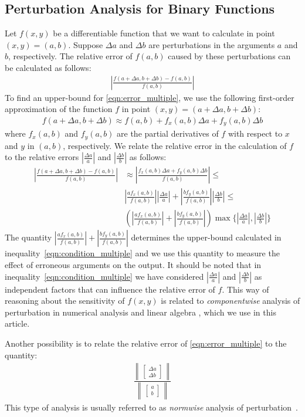 \documentclass{article}
\newcommand{\dx}{\Delta a}
\newcommand{\dy}{\Delta b}
\numberwithin{mytheorem}{section}
\begin{document}
\subsection{Perturbation Analysis for Binary Functions}\label{subsec:pert_bin}
Let $f(x,y)$ be a differentiable function that we want to calculate in point $(x,y)=(a,b)$. Suppose $\dx$ and $\dy$ are perturbations in the arguments $a$ and $b$, respectively. The relative error of $f(a,b)$ caused by these perturbations can be calculated as follows:
\begin{align}
|\frac{f(a+\dx,b+\dy)-f(a,b)}{f(a,b)}|\label{eqn:error_multiple}
\end{align}
To find an upper-bound for \eqref{eqn:error_multiple}, we use the following first-order approximation of the function $f$ in point $(x,y)=(a+\dx, b+\dy)$:
\begin{align*}
f(a+\dx,b+\dy)\approx f(a,b)+f_x(a,b)\dx+f_y(a,b)\dy
\end{align*}
where $f_x(a,b)$ and $f_y(a,b)$ are the partial derivatives of $f$ with respect to $x$ and $y$ in $(a,b)$, respectively. We relate the relative error in the calculation of $f$ to the relative errors $|\frac{\dx}{a}|$ and $|\frac{\dy}{b}|$ as follows:
\begin{align}
|\frac{f(a+\dx,b+\dy)-f(a,b)}{f(a,b)}|&\approx |\frac{f_x(a,b)\dx +f_y(a,b)\dy}{f(a,b)}|\leq \nonumber\\
& |\frac{af_x(a,b)}{f(a,b)}||\frac{\dx}{a}|+|\frac{bf_y(a,b)}{f(a,b)}||\frac{\dy}{b}|\leq \nonumber\\
& (|\frac{af_x(a,b)}{f(a,b)}|+|\frac{bf_y(a,b)}{f(a,b)}|)\max\{|\frac{\dx}{a}|,|\frac{\dy}{b}|\}\label{eqn:condition_multiple}
\end{align}   
The quantity $|\frac{af_x(a,b)}{f(a,b)}|+|\frac{bf_y(a,b)}{f(a,b)}|$ determines the upper-bound calculated in inequality~\eqref{eqn:condition_multiple} and we use this quantity to measure the effect of erroneous arguments on the output. It should be noted that in inequality~\eqref{eqn:condition_multiple} we have considered $|\frac{\dx}{a}|$ and $|\frac{\dy}{b}|$ as independent factors that can influence the relative error of $f$. This way of reasoning about the sensitivity of $f(x,y)$ is related to \textit{componentwise} analysis of perturbation in numerical analysis and linear algebra \cite{HD12}, which we use in this article. 

Another possibility is to relate the relative error of \eqref{eqn:error_multiple} to the quantity:
\begin{align*}
\frac{
	\begin{Vmatrix}
 		\begin{bmatrix}
			\dx \\ \dy
		\end{bmatrix}
	\end{Vmatrix}  }
   {\begin{Vmatrix}   
		\begin{bmatrix}
			a \\ b
		\end{bmatrix} 
	\end{Vmatrix}}
\end{align*}
This type of analysis is usually referred to as \textit{normwise} analysis of perturbation~\cite{HD12}. 
\end{document}

